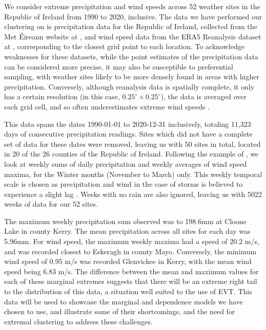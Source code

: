 \documentclass{article}
\numberwithin{equation}{section}
\begin{document}
We consider extreme precipitation and wind speeds across 52 weather sites in the Republic of Ireland from 1990 to 2020, inclusive.  
The data we have performed our clustering on is precipitation data for the Republic of Ireland, collected from the Met Éireann website at \citet{metHistoricalData}, and wind speed data from the ERA5 Reanalysis dataset at \citet{Hersbach2020}, corresponding to the closest grid point to each location.
To acknowledge weaknesses for these datasets, while the point estimates of the precipitation data can be considered more precise, it may also be susceptible to preferential sampling, with weather sites likely to be more densely found in areas with higher precipitation.
Conversely, although reanalysis data is spatially complete, it only has a certain resolution (in this case, $0.25^{\circ} \times 0.25^{\circ}$), the data is averaged over each grid cell, and so often underestimates extreme wind speeds \citep{Gandoin2024}.

This data spans the dates 1990-01-01 to 2020-12-31 inclusively, totaling 11,323 days of consecutive precipitation readings. 
Sites which did not have a complete set of data for these dates were removed, leaving us with 50 sites in total, located in 20 of the 26 counties of the Republic of Ireland. 
Following the example of \citet{Vignotto2021}, we look at weekly sums of daily precipitation and weekly averages of wind speed maxima, for the Winter months (November to March) only.
This weekly temporal scale is chosen as precipitation and wind in the case of storms is believed to experience a slight lag \citep{Bengtsson2009}.
Weeks with no rain are also ignored, leaving us with 5022 weeks of data for our 52 sites.

The maximum weekly precipitation sum observed was to 198.6mm at Cloone Lake in county Kerry. 
The mean precipitation across all sites for each day was 5.96mm.
For wind speed, the maximum weekly maxima had a speed of 20.2 m/s, and was recorded closest to Eskeragh in county Mayo.
Conversely, the minimum wind speed of 0.95 m/s was recorded Glenvickee in Kerry, with the mean wind speed being 6.83 m/s.
The difference between the mean and maximum values for each of these marginal extremes suggests that there will be an extreme right tail to the distribution of this data, a situation well suited to the use of EVT.
This data will be used to showcase the marginal and dependence models we have chosen to use, and illustrate some of their shortcomings, and the need for extremal clustering to address these challenges.
\end{document}
